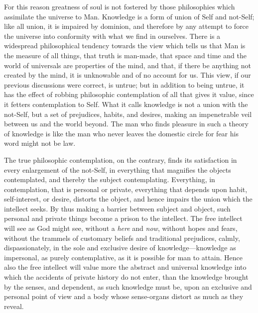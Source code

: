 \documentclass[oneside,letterpaper,12pt]{book}
\begin{document}
For this reason greatness of soul is not fostered by those philosophies
which assimilate the universe to Man. Knowledge is a form of union of
Self and not-Self; like all union, it is impaired by dominion, and
therefore by any attempt to force the universe into conformity with what
we find in ourselves. There is a widespread philosophical tendency
towards the view which tells us that Man is the measure of all things,
that truth is man-made, that space and time and the world of universals
are properties of the mind, and that, if there be anything not created
by the mind, it is unknowable and of no account for us. This view, if
our previous discussions were correct, is untrue; but in addition to
being untrue, it has the effect of robbing philosophic contemplation of
all that gives it value, since it fetters contemplation to Self. What it
calls knowledge is not a union with the not-Self, but a set of
prejudices, habits, and desires, making an impenetrable veil between us
and the world beyond. The man who finds pleasure in such a theory of
knowledge is like the man who never leaves the domestic circle for fear
his word might not be law.

The true philosophic contemplation, on the contrary, finds its
satisfaction in every enlargement of the not-Self, in everything that
magnifies the objects contemplated, and thereby the subject
contemplating. Everything, in contemplation, that is personal or
private, everything that depends upon habit, self-interest, or desire,
distorts the object, and hence impairs the union which the intellect
seeks. By thus making a barrier between subject and object, such
personal and private things become a prison to the intellect. The free
intellect will see as God might see, without a \emph{here} and
\emph{now}, without hopes and fears, without the trammels of customary
beliefs and traditional prejudices, calmly, dispassionately, in the sole
and exclusive desire of knowledge---knowledge as impersonal, as purely
contemplative, as it is possible for man to attain. Hence also the free
intellect will value more the abstract and universal knowledge into
which the accidents of private history do not enter, than the knowledge
brought by the senses, and dependent, as such knowledge must be, upon an
exclusive and personal point of view and a body whose sense-organs
distort as much as they reveal. \label{impersonal}
\end{document}
